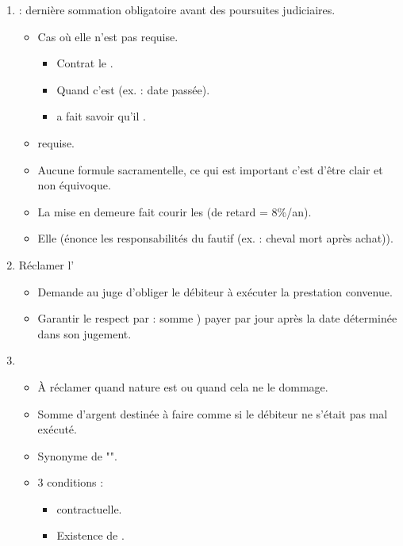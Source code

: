 \begin{enumerate}
	\item {} : dernière sommation obligatoire avant des poursuites judiciaires.
	\begin{itemize}
		\item Cas où elle n'est pas requise.
		\begin{itemize}
			\item Contrat le .
			\item Quand c'est  (ex. : date passée).
			\item {} a fait savoir qu'il .
		\end{itemize}
		\item {} requise.
		\item Aucune formule sacramentelle, ce qui est important c'est d'être clair et non équivoque.
		\item La mise en demeure fait courir les  (de retard = 8\%/an).
		\item Elle  (énonce les responsabilités du fautif (ex. : cheval mort après achat)).
	\end{itemize}
	\item Réclamer l'
	\begin{itemize}
		\item Demande au juge d'obliger le débiteur à exécuter la prestation convenue.
		\item Garantir le respect par  : somme ) payer par jour après la date déterminée dans son jugement.
	\end{itemize}
	\item {}
	\begin{itemize}
		\item À réclamer quand nature est  ou quand cela ne  le dommage.
		\item Somme d'argent destinée à faire comme si le débiteur ne s'était pas mal exécuté.
		\item Synonyme de "".
		\item 3 conditions :
		\begin{itemize}
			\item {} contractuelle.
			\item Existence de .

\end{itemize}
\end{itemize}
\end{enumerate}
